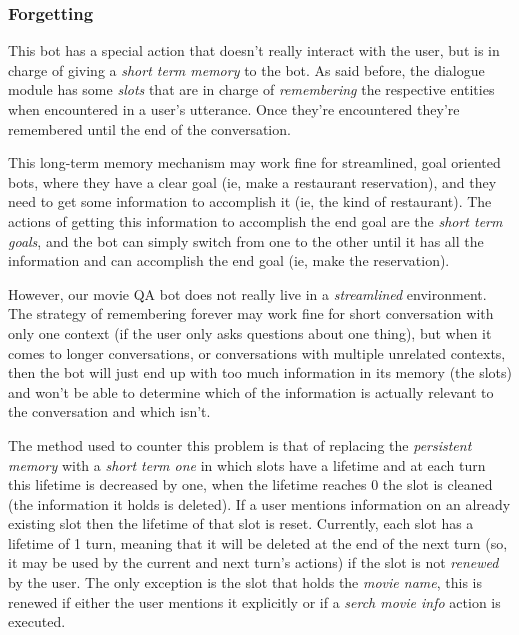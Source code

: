 \documentclass[11pt,a4paper]{article}
\begin{document}
		
		\subsubsection{Forgetting}
		\label{ssec-forgetting}	
		
			This bot has a special action that doesn't really interact with the user, but is in charge of giving a \textit{short term memory} to the bot. As said before, the dialogue module has some \textit{slots} that are in charge of \textit{remembering} the respective entities when encountered in a user's utterance. Once they're encountered they're remembered until the end of the conversation. 
			
			This long-term memory mechanism may work fine for streamlined, goal oriented bots, where they have a clear goal (ie, make a restaurant reservation), and they need to get some information to accomplish it (ie, the kind of restaurant). The actions of getting this information to accomplish the end goal are the \textit{short term goals}, and the bot can simply switch from one to the other until it has all the information and can accomplish the end goal (ie, make the reservation). 
			
			However, our movie QA bot does not really live in a \textit{streamlined} environment. The strategy of remembering forever may work fine for short conversation with only one context (if the user only asks questions about one thing), but when it comes to longer conversations, or conversations with multiple unrelated contexts, then the bot will just end up with too much information in its memory (the slots) and won't be able to determine which of the information is actually relevant to the conversation and which isn't.
			
			The method used to counter this problem is that of replacing the \textit{persistent memory} with a \textit{short term one} in which slots have a lifetime and at each turn this lifetime is decreased by one, when the lifetime reaches 0 the slot is cleaned (the information it holds is deleted). If a user mentions information on an already existing slot then the lifetime of that slot is reset. Currently, each slot has a lifetime of 1 turn, meaning that it will be deleted at the end of the next turn (so, it may be used by the current and next turn's actions) if the slot is not \textit{renewed} by the user. The only exception is the slot that holds the \textit{movie name}, this is renewed if either the user mentions it explicitly or if a \textit{serch movie info} action is executed. 
			
\end{document}
